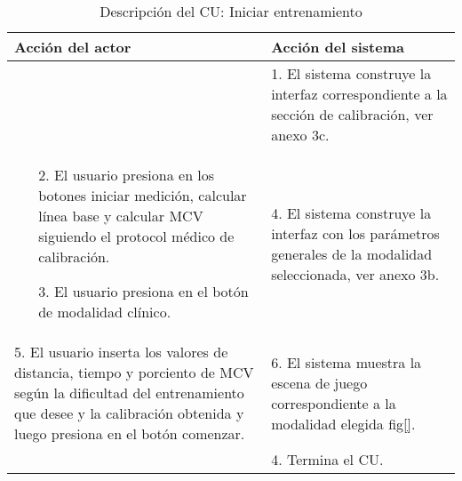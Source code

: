 \begin{center}
\begin{table}
\begin{tabularx}{\textwidth}{|X|X|}
            Acción del actor & Acción del sistema \\\hline
                
            & 
            1. El sistema construye la interfaz correspondiente a la sección de calibración, ver anexo 3c. \\\hline
            \begin{enumerate}
                \item[2.] El usuario presiona en los botones iniciar medición, calcular línea base y calcular MCV siguiendo el protocol médico de calibración.
                \item[3.] El usuario presiona en el botón de modalidad clínico.
            \end{enumerate}
            &
            4. El sistema construye la interfaz con los parámetros generales de la modalidad seleccionada, ver anexo 3b. \\\hline
            5. El usuario inserta los valores de distancia, tiempo y porciento de MCV según la dificultad del entrenamiento que desee y la calibración obtenida y luego presiona en el botón comenzar. 
            & 
            6. El sistema muestra la escena de juego correspondiente a la modalidad elegida fig\ref{}. \\ &4. Termina el CU. \\\hline
            

            
            


        \end{tabularx}

        \caption{Descripción del CU: Iniciar entrenamiento}
    \end{table}
\end{center}